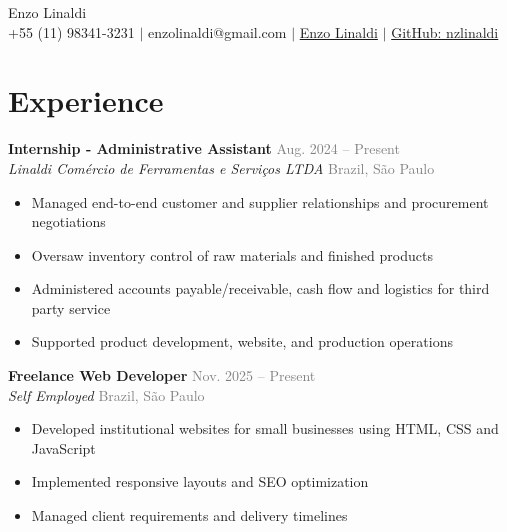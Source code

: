 \documentclass[a4paper, 12pt]{article}
\newcommand{\resumeSubSection}[4]{%
\noindent
\textbf{#1} \hfill \textcolor{gray}{#2}\\
\textit{#3} \hfill \textcolor{gray}{#4}
}
\newcommand{\resumeItemsSubSection}[1]{%
\vspace{-9}\small \begin{itemize}\setlength{\itemsep}{-0.3em}
#1
\end{itemize}
}
\begin{document}

\begin{center}
    {\Huge Enzo Linaldi} \\ \vspace{5pt}
    \small \faPhone* +55 (11) 98341-3231 \hspace{1pt} $|$
    \hspace{1pt} \faEnvelope \hspace{2pt} enzolinaldi@gmail.com \hspace{1pt} $|$ 
    \hspace{1pt} \faLinkedin \hspace{2pt} \href{https://www.linkedin.com/in/enzo-linaldi-315204389/}{Enzo Linaldi} \hspace{1pt} $|$
    \hspace{1pt} \faGithub \hspace{2pt} \href{https://github.com/nzlinaldi}{GitHub: nzlinaldi}
    \\ \vspace{-3pt}
\end{center}

\section{Experience}
\resumeSubSection
{Internship - Administrative Assistant}
{Aug. 2024 -- Present}
{Linaldi Comércio de Ferramentas e Serviços LTDA}{Brazil, São Paulo}

\resumeItemsSubSection{
\item Managed end-to-end customer and supplier relationships and procurement negotiations
\item Oversaw inventory control of raw materials and finished products
\item Administered accounts payable/receivable, cash flow and logistics for third party service
\item Supported product development, website, and production operations
}

\resumeSubSection{Freelance Web Developer}{Nov. 2025 -- Present}{Self Employed}{Brazil, São Paulo}

\resumeItemsSubSection{
\item Developed institutional websites for small businesses using HTML, CSS and JavaScript
\item Implemented responsive layouts and SEO optimization
\item Managed client requirements and delivery timelines
}
\end{document}
